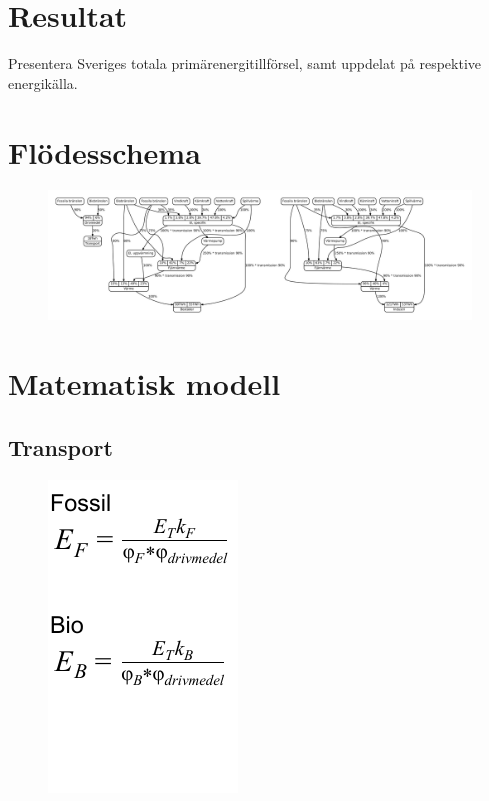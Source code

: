 \documentclass[a4paper,11pt,fleqn]{article}
\begin{document}
\section{Resultat}
Presentera Sveriges totala primärenergitillförsel, samt uppdelat på
respektive energikälla.

\appendix
\section{Flödesschema}
\begin{figure}[h!]
	\centering 
 		\includegraphics[scale = 0.2]{diagram.pdf}
		\label{diagram}
\end{figure}
\section {Matematisk modell}
\subsection{Transport}
\begin{figure}[h!]
	\centering 
 		\includegraphics[scale = 0.75]{transport2.pdf}
		\label{diagram}
\end{figure}
\end{document}
